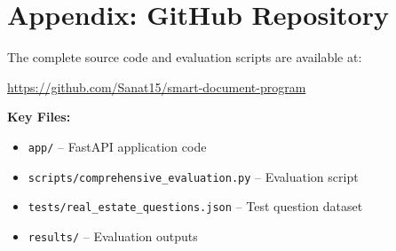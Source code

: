 \documentclass[11pt,a4paper]{article}
\begin{document}
\section{Appendix: GitHub Repository}

The complete source code and evaluation scripts are available at:

\begin{center}
\url{https://github.com/Sanat15/smart-document-program}
\end{center}

\textbf{Key Files:}
\begin{itemize}
    \item \texttt{app/} -- FastAPI application code
    \item \texttt{scripts/comprehensive\_evaluation.py} -- Evaluation script
    \item \texttt{tests/real\_estate\_questions.json} -- Test question dataset
    \item \texttt{results/} -- Evaluation outputs
\end{itemize}
\end{document}
